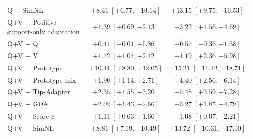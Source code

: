 \begin{table}[tp]
\begin{tabular*}{\textwidth}{@{\extracolsep{\fill}}lcc@{}}
Q $-$ SimNL & $+8.41\;[+6.77,+10.14]$ & $+13.15\;[+9.75,+16.53]$ \\
Q+V $-$ Positive-support-only adaptation & $+1.39\;[+0.69,+2.13]$ & $+3.22\;[+1.56,+4.69]$ \\
Q+V $-$ Q & $+0.41\;[-0.01,+0.86]$ & $+0.57\;[-0.36,+1.38]$ \\
Q+V $-$ V & $+1.72\;[+1.04,+2.42]$ & $+4.19\;[+2.36,+5.98]$ \\
Q+V $-$ Prototype & $+10.44\;[+8.80,+12.05]$ & $+15.21\;[+11.42,+18.71]$ \\
Q+V $-$ Prototype mix & $+1.90\;[+1.14,+2.71]$ & $+4.40\;[+2.56,+6.14]$ \\
Q+V $-$ Tip-Adapter & $+2.35\;[+1.55,+3.20]$ & $+5.48\;[+3.59,+7.28]$ \\
Q+V $-$ GDA & $+2.02\;[+1.43,+2.66]$ & $+3.27\;[+1.85,+4.79]$ \\
Q+V $-$ Score S & $+1.11\;[+0.63,+1.66]$ & $+1.08\;[+0.07,+2.21]$ \\
Q+V $-$ SimNL & $+8.81\;[+7.19,+10.49]$ & $+13.72\;[+10.31,+17.00]$ \\
\bottomrule
\end{tabular*}
\end{table}

